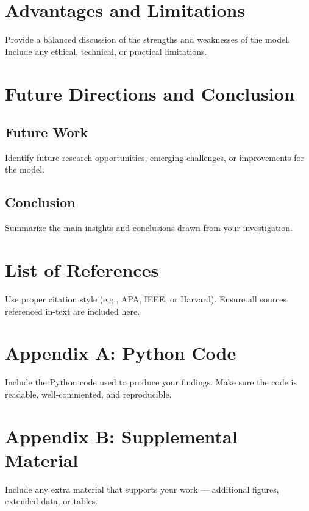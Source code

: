 \documentclass[12pt]{article}
\begin{document}
\section{Advantages and Limitations}
Provide a balanced discussion of the strengths and weaknesses of the model.  
Include any ethical, technical, or practical limitations.

\section{Future Directions and Conclusion}

\subsection{Future Work}
Identify future research opportunities, emerging challenges, or improvements for the model.

\subsection{Conclusion}
Summarize the main insights and conclusions drawn from your investigation.

\newpage
\section*{List of References}
Use proper citation style (e.g., APA, IEEE, or Harvard).  
Ensure all sources referenced in-text are included here.

\appendix

\section{Appendix A: Python Code}
Include the Python code used to produce your findings.  
Make sure the code is readable, well-commented, and reproducible.

\section{Appendix B: Supplemental Material}
Include any extra material that supports your work — additional figures, extended data, or tables.
\end{document}
